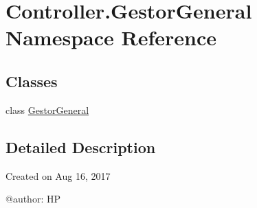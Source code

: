 \hypertarget{namespace_controller_1_1_gestor_general}{}\section{Controller.\+Gestor\+General Namespace Reference}
\label{namespace_controller_1_1_gestor_general}
\subsection*{Classes}
\begin{DoxyCompactItemize}
\item 
class \hyperlink{class_controller_1_1_gestor_general_1_1_gestor_general}{Gestor\+General}
\end{DoxyCompactItemize}


\subsection{Detailed Description}
\begin{DoxyVerb}Created on Aug 16, 2017

@author: HP
\end{DoxyVerb}
 